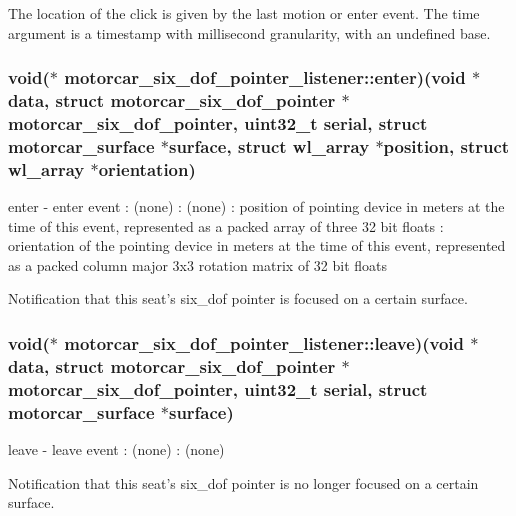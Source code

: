 The location of the click is given by the last motion or enter event. The time argument is a timestamp with millisecond granularity, with an undefined base. \hypertarget{structmotorcar__six__dof__pointer__listener_a60aa469977dee03cfe23738b53628c0a}{
\subsubsection[{enter}]{\setlength{\rightskip}{0pt plus 5cm}void($\ast$ motorcar\-\_\-six\-\_\-dof\-\_\-pointer\-\_\-listener\-::enter)(void $\ast$data, struct motorcar\-\_\-six\-\_\-dof\-\_\-pointer $\ast$motorcar\-\_\-six\-\_\-dof\-\_\-pointer, uint32\-\_\-t serial, struct motorcar\-\_\-surface $\ast${\bf surface}, struct wl\-\_\-array $\ast$position, struct wl\-\_\-array $\ast$orientation)}}\label{structmotorcar__six__dof__pointer__listener_a60aa469977dee03cfe23738b53628c0a}
enter -\/ enter event \-: (none) \-: (none) \-: position of pointing device in meters at the time of this event, represented as a packed array of three 32 bit floats \-: orientation of the pointing device in meters at the time of this event, represented as a packed column major 3x3 rotation matrix of 32 bit floats

Notification that this seat's six\-\_\-dof pointer is focused on a certain surface. \hypertarget{structmotorcar__six__dof__pointer__listener_ac00b36c868704689626997fd27b407b9}{
\subsubsection[{leave}]{\setlength{\rightskip}{0pt plus 5cm}void($\ast$ motorcar\-\_\-six\-\_\-dof\-\_\-pointer\-\_\-listener\-::leave)(void $\ast$data, struct motorcar\-\_\-six\-\_\-dof\-\_\-pointer $\ast$motorcar\-\_\-six\-\_\-dof\-\_\-pointer, uint32\-\_\-t serial, struct motorcar\-\_\-surface $\ast${\bf surface})}}\label{structmotorcar__six__dof__pointer__listener_ac00b36c868704689626997fd27b407b9}
leave -\/ leave event \-: (none) \-: (none)

Notification that this seat's six\-\_\-dof pointer is no longer focused on a certain surface.

